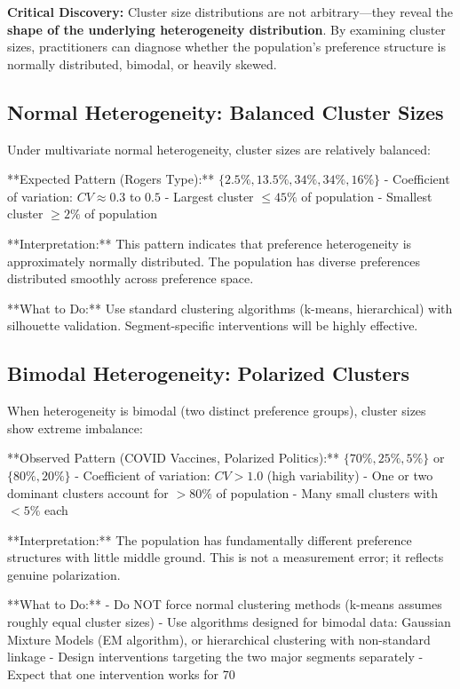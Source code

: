 \textbf{Critical Discovery:} Cluster size distributions are not arbitrary---they reveal
the \textbf{shape of the underlying heterogeneity distribution}. By examining cluster
sizes, practitioners can diagnose whether the population's preference structure is
normally distributed, bimodal, or heavily skewed.

\subsection{Normal Heterogeneity: Balanced Cluster Sizes}

Under multivariate normal heterogeneity, cluster sizes are relatively balanced:

**Expected Pattern (Rogers Type):** $\{2.5\%, 13.5\%, 34\%, 34\%, 16\%\}$
- Coefficient of variation: $CV \approx 0.3$ to $0.5$
- Largest cluster $\leq 45\%$ of population
- Smallest cluster $\geq 2\%$ of population

**Interpretation:** This pattern indicates that preference heterogeneity is approximately
normally distributed. The population has diverse preferences distributed smoothly across
preference space.

**What to Do:** Use standard clustering algorithms (k-means, hierarchical) with silhouette
validation. Segment-specific interventions will be highly effective.

\subsection{Bimodal Heterogeneity: Polarized Clusters}

When heterogeneity is bimodal (two distinct preference groups), cluster sizes show extreme imbalance:

**Observed Pattern (COVID Vaccines, Polarized Politics):** $\{70\%, 25\%, 5\%\}$ or $\{80\%, 20\%\}$
- Coefficient of variation: $CV > 1.0$ (high variability)
- One or two dominant clusters account for $>80\%$ of population
- Many small clusters with $<5\%$ each

**Interpretation:** The population has fundamentally different preference structures with
little middle ground. This is not a measurement error; it reflects genuine polarization.

**What to Do:**
- Do NOT force normal clustering methods (k-means assumes roughly equal cluster sizes)
- Use algorithms designed for bimodal data: Gaussian Mixture Models (EM algorithm),
or hierarchical clustering with non-standard linkage
- Design interventions targeting the two major segments separately
- Expect that one intervention works for 70%

